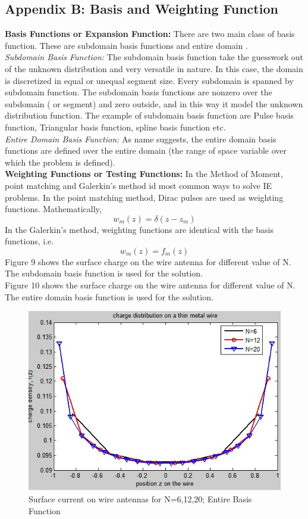 \documentclass[aps,prstab,twocolumn,superscriptaddress,groupedaddress,showkeys,nofootinbib]{revtex4}  %
\begin{document}
\subsection*{Appendix B:  Basis and Weighting Function}
\textbf{Basis Functions or Expansion Function: } There are two main class of basis function. These are subdomain basis functions and entire domain \cite{garg}.\\ 
\textit{Subdomain Basis Function: } The subdomain basis function take the guesswork out of the unknown distribution and very versatile in nature. In this case, the domain is discretized in equal or unequal segment size. Every subdomain is spanned by subdomain function. The subdomain basis functions are nonzero over the subdomain ( or segment) and zero outside, and in this way it model the unknown distribution function. The example of subdomain basis function are Pulse basis function, Triangular basis function, spline basis function etc.\\
\textit{Entire Domain Basis Function: }As name suggests, the entire domain basis functions are defined over the entire domain (the range of space variable over which the problem is defined).\\
\textbf{Weighting Functions or Testing Functions: } In the Method of Moment, point matching and Galerkin's method id most common ways to solve IE problems. In the point matching method, Dirac pulses are used as weighting functions. Mathematically, 
\begin{equation}
w_{m}(z)=\delta (z-z_m)
\end{equation}
In the Galerkin's method, weighting functions are identical with the basis functions, i.e.
\begin{equation}
w_{m}(z)=f_{m}(z)
\end{equation}
Figure 9 shows the surface charge on the wire antenna for different value of N. The subdomain basis function is used for the solution.\\
Figure 10 shows the surface charge on the wire antenna for different value of N. The entire domain basis function is used for the solution. 
\begin{figure}[here!]
\centering
\includegraphics[scale=0.5]{entire.jpg}
\caption{Surface current on wire antennas for N=6,12,20; Entire Basis Function }
\end{figure}
\end{document}
